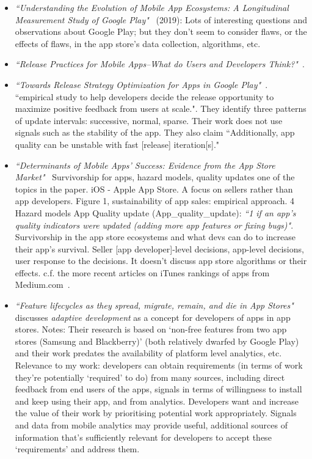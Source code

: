 \begin{itemize}
    \item \emph{``Understanding the Evolution of Mobile App Ecosystems: A Longitudinal Measurement Study of Google Play"}~\cite{wang2019understanding} (2019): Lots of interesting questions and observations about Google Play; but they don't seem to consider flaws, or the effects of flaws, in the app store's data collection, algorithms, etc.
    
    \item \emph{``Release Practices for Mobile Apps--What do Users and Developers Think?"}~\cite{nayebi2016release}.
    
    \item \emph{``Towards Release Strategy Optimization for Apps in Google Play"}~\citep{shen2017_towards_release_strategy_optimization_for_apps_in_google_play}. ``empirical study to help developers decide the release opportunity to maximize positive feedback from users at scale.". They identify three patterns of update intervals: successive, normal, sparse. Their work does not use signals such as the stability of the app. They also claim ``Additionally, app quality can be unstable with fast [release] iteration[s]."
    
    \item \emph{``Determinants of Mobile Apps' Success: Evidence from the App Store Market"}~\citep{lee2014_determinants_of_mobile_app_success_evidence_from_the_app_store_market} Survivorship for apps, hazard models, quality updates one of the topics in the paper. iOS - Apple App Store. A focus on sellers rather than app developers. Figure 1, sustainability of app sales: empirical approach. 4 Hazard models App Quality update (App\_quality\_update): \emph{``1 if an app’s quality indicators were updated (adding more app features or fixing bugs)"}. Survivorship in the app store ecosystems and what devs can do to increase their app's survival. Seller [app developer]-level decisions, app-level decisions, user response to the decisions. It doesn't discuss app store algorithms or their effects. c.f. the more recent articles on iTunes rankings of apps from Medium.com~\citep{lotan2015_apple_apps_and_algorithmic_glitches, lotan2015_apples_app_charts}.
    
    \item \emph{``Feature lifecycles as they spread, migrate, remain, and die in App Stores"}~\cite{sarro2015_feature_lifecycles_in_appstores} discusses \emph{adaptive development} as a concept for developers of apps in app stores. Notes: Their research is based on `non-free features from two app stores (Samsung and Blackberry)' (both relatively dwarfed by Google Play) and their work predates the availability of platform level analytics, etc. Relevance to my work: developers can obtain requirements (in terms of work they're potentially `required' to do) from many sources, including direct feedback from end users of the apps, signals in terms of willingness to install and keep using their app, and from analytics. Developers want and increase the value of their work by prioritising potential work appropriately. Signals and data from mobile analytics may provide useful, additional sources of information that's sufficiently relevant for developers to accept these `requirements' and address them.
    

\end{itemize}
